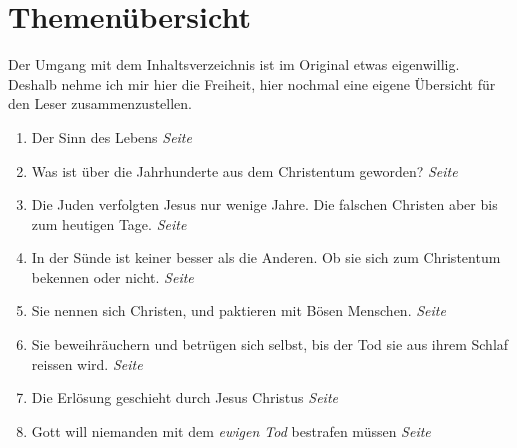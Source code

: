 \chapter{Themenübersicht} \label{ref:theme_nuebersicht}


Der Umgang mit dem Inhaltsverzeichnis ist im Original etwas eigenwillig. Deshalb
nehme ich mir hier die Freiheit, hier nochmal eine eigene Übersicht für den
Leser zusammenzustellen.

\begin{enumerate}
 \item Der Sinn des Lebens
 \dotfill \textit{Seite~\pageref{ref:vorw_sinndes_lebens}}\\

 \item Was ist über die Jahrhunderte aus dem Christentum geworden?
 \dotfill \textit{Seite~\pageref{ref:01_02_urchristentum}}\\

 \item Die Juden verfolgten Jesus nur wenige Jahre. Die falschen Christen aber
bis zum heutigen Tage.
 \dotfill \textit{Seite~\pageref{ref:01_04_zweite_kreuzigung}}\\

 \item In der Sünde ist keiner besser als die Anderen. Ob sie sich zum
Christentum bekennen oder nicht.
 \dotfill \textit{Seite~\pageref{ref:01_05_in_suende_gleich}}\\

 \item Sie nennen sich Christen, und paktieren mit Bösen Menschen.
 \dotfill \textit{Seite
\pageref{ref:01_05_in_suende_verbinden}}\\

 \item Sie beweihräuchern und betrügen sich selbst, bis der Tod sie aus ihrem
Schlaf reissen wird.
 \dotfill \textit{Seite~\pageref{ref:01_07_selbstbetrug}}\\

 \item Die Erlösung geschieht durch Jesus Christus
 \dotfill \textit{Seite
\pageref{ref:01_10_jesus_der_erloeser}}\\

 \item Gott will niemanden mit dem \textit{ewigen Tod} bestrafen müssen
 \dotfill \textit{Seite
\pageref{ref:02_02_kein_gefallen_am_tod}}\\


\end{enumerate}
